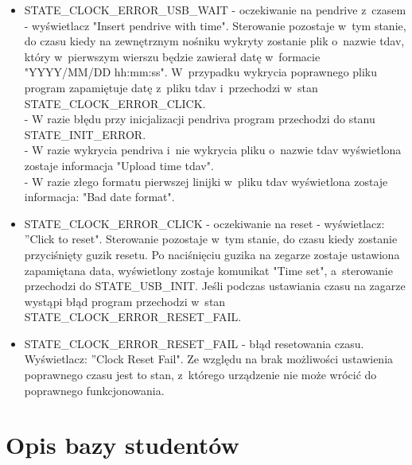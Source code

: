 \documentclass[declaration,shortabstract, mgr]{iithesis}
\begin{document}
\begin{itemize}
\item STATE\_CLOCK\_ERROR\_USB\_WAIT - oczekiwanie na pendrive z~czasem - wyświetlacz "Insert pendrive with time". Sterowanie pozostaje w~tym stanie, do czasu kiedy na zewnętrznym nośniku wykryty zostanie plik o~nazwie tdav, który w~pierwszym wierszu będzie zawierał datę w~formacie "YYYY/MM/DD hh:mm:ss". W~przypadku wykrycia poprawnego pliku program zapamiętuje datę z~pliku tdav i~przechodzi w~stan STATE\_CLOCK\_ERROR\_CLICK.\\
- W razie błędu przy inicjalizacji pendriva program przechodzi do stanu \\STATE\_INIT\_ERROR. \\
- W razie wykrycia pendriva i~nie wykrycia pliku o~nazwie tdav wyświetlona zostaje informacja "Upload time tdav".\\
- W razie złego formatu pierwszej linijki w~pliku tdav wyświetlona zostaje informacja: "Bad date format".
\item STATE\_CLOCK\_ERROR\_CLICK - oczekiwanie na reset - wyświetlacz: ''Click to reset". Sterowanie pozostaje w~tym stanie, do czasu kiedy zostanie przyciśnięty guzik resetu. Po naciśnięciu guzika na zegarze zostaje ustawiona zapamiętana data, wyświetlony zostaje komunikat "Time set", a~sterowanie przechodzi do STATE\_USB\_INIT. Jeśli podczas ustawiania czasu na zagarze wystąpi błąd program przechodzi w~stan STATE\_CLOCK\_ERROR\_RESET\_FAIL.
\item STATE\_CLOCK\_ERROR\_RESET\_FAIL - błąd resetowania czasu. Wyświetlacz: ''Clock Reset Fail". Ze względu na brak możliwości ustawienia poprawnego czasu jest to stan, z~którego urządzenie nie może wrócić do poprawnego funkcjonowania.
\end{itemize}

\section{Opis bazy studentów}\label{a:bazastudentów}
\end{document}
